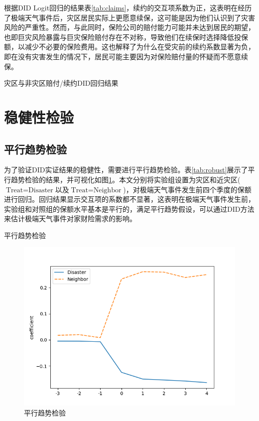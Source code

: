 根据DID Logit回归的结果表\ref{tab:claims}，续约的交互项系数为正，这表明在经历了极端天气事件后，灾区居民实际上更愿意续保，这可能是因为他们认识到了灾害风险的严重性。然而，与此同时，保险公司的赔付能力可能并未达到居民的期望，也即巨灾风险暴露与巨灾保险赔付存在不对称\citep{张旭升2010中国巨灾风险暴露与巨灾保险赔付不对称实证}，导致他们在续保时选择降低投保额，以减少不必要的保险费用。这也解释了为什么在受灾前的续约系数显著为负，即在没有灾害发生的情况下，居民可能主要因为对保险赔付量的怀疑而不愿意续保。

\begin{table}[H]
    \centering
    \caption{灾区与非灾区赔付/续约DID回归结果}\label{tab:claims}
    
\end{table}

\section{稳健性检验}
\subsection{平行趋势检验}

为了验证DID实证结果的稳健性，需要进行平行趋势检验。表\ref{tab:robust}展示了平行趋势检验的结果，并可视化如图\ref{fig:robust}。本文分别将实验组设置为灾区和近灾区($\text{Treat}=\text{Disaster}$以及$\text{Treat}=\text{Neighbor}$)，对极端天气事件发生前四个季度的保额进行回归。回归结果显示交互项的系数都不显著，这表明在极端天气事件发生前，实验组和对照组的保额水平基本是平行的，满足平行趋势假设，可以通过DID方法来估计极端天气事件对家财险需求的影响。

\begin{table}[htbp]
    \centering
    \caption{平行趋势检验}\label{tab:robust}
    
\end{table}

\begin{figure}[htbp]
    \includegraphics[width=\linewidth]{lib/img/robust.png}
    \caption{平行趋势检验}\label{fig:robust}
\end{figure}
